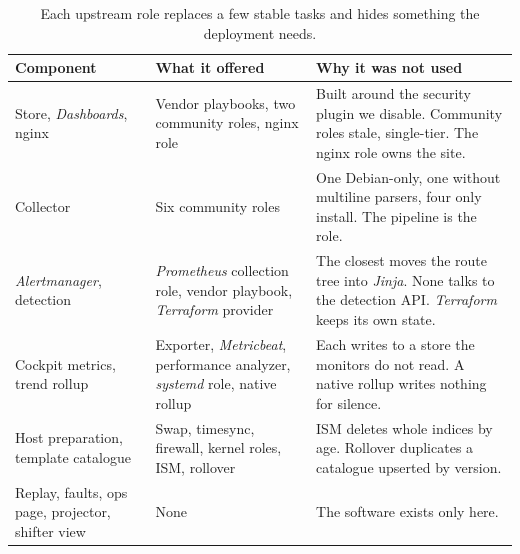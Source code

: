 \begin{table}[htbp]\caption{Each upstream role replaces a few stable tasks and hides something the deployment needs.}\label{tab:upstream}\centering\footnotesize
\begin{tabularx}{\textwidth}{L{0.17\textwidth} L{0.33\textwidth} X}
\toprule
Component & What it offered & Why it was not used \\
\midrule
Store, \textit{Dashboards}, nginx & Vendor playbooks, two community roles, nginx role & Built around the security plugin we disable. Community roles stale, single-tier. The nginx role owns the site. \\
Collector & Six community roles & One Debian-only, one without multiline parsers, four only install. The pipeline is the role. \\
\textit{Alertmanager}, detection & \textit{Prometheus} collection role, vendor playbook, \textit{Terraform} provider & The closest moves the route tree into \textit{Jinja}. None talks to the detection API. \textit{Terraform} keeps its own state. \\
Cockpit metrics, trend rollup & Exporter, \textit{Metricbeat}, performance analyzer, \textit{systemd} role, native rollup & Each writes to a store the monitors do not read. A native rollup writes nothing for silence. \\
Host preparation, template catalogue & Swap, timesync, firewall, kernel roles, ISM, rollover & ISM deletes whole indices by age. Rollover duplicates a catalogue upserted by version. \\
Replay, faults, ops page, projector, shifter view & None & The software exists only here. \\
\bottomrule
\end{tabularx}
\end{table}

